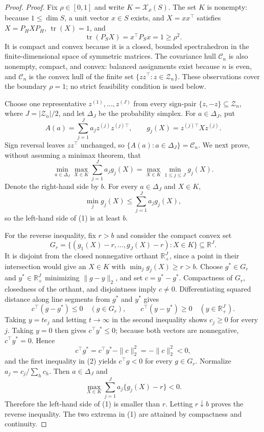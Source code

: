 \documentclass{article}
\begin{document}
\begin{proof}
\textit{Proof.}
Fix \(\rho\in[0,1]\) and write \(K=\mathcal X_\rho(S)\).  The set \(K\) is nonempty: because \(1\leq\dim S\), a unit vector \(x\in S\) exists, and \(X=xx^\top\) satisfies \(X=P_HXP_H\), \(\operatorname{tr}(X)=1\), and
\[
\operatorname{tr}(P_SX)=x^\top P_Sx=1\geq\rho^2.
\]
It is compact and convex because it is a closed, bounded spectrahedron in the finite-dimensional space of symmetric matrices.  The covariance hull \(\mathcal C_n\) is also nonempty, compact, and convex: balanced assignments exist because \(n\) is even, and \(\mathcal C_n\) is the convex hull of the finite set \(\{zz^\top:z\in\mathcal Z_n\}\).  These observations cover the boundary \(\rho=1\); no strict feasibility condition is used below.

Choose one representative \(z^{(1)},\ldots,z^{(J)}\) from every sign-pair \(\{z,-z\}\subseteq\mathcal Z_n\), where \(J=|\mathcal Z_n|/2\), and let \(\Delta_J\) be the probability simplex.  For \(a\in\Delta_J\), put
\[
A(a)=\sum_{j=1}^J a_j z^{(j)}z^{(j)\top},
\qquad
g_j(X)=z^{(j)\top}Xz^{(j)}.
\]
Sign reversal leaves \(zz^\top\) unchanged, so \(\{A(a):a\in\Delta_J\}=\mathcal C_n\).  We next prove, without assuming a minimax theorem, that
\[
\min_{a\in\Delta_J}\max_{X\in K}\sum_{j=1}^J a_jg_j(X)
=
\max_{X\in K}\min_{1\leq j\leq J}g_j(X).
\tag{1}
\]
Denote the right-hand side by \(b\).  For every \(a\in\Delta_J\) and \(X\in K\),
\[
\min_j g_j(X)\leq\sum_{j=1}^J a_jg_j(X),
\]
so the left-hand side of (1) is at least \(b\).

For the reverse inequality, fix \(r>b\) and consider the compact convex set
\[
G_r=\{(g_1(X)-r,\ldots,g_J(X)-r):X\in K\}\subseteq\mathbb R^J.
\]
It is disjoint from the closed nonnegative orthant \(\mathbb R_+^J\), since a point in their intersection would give an \(X\in K\) with \(\min_jg_j(X)\geq r>b\).  Choose \(g^*\in G_r\) and \(y^*\in\mathbb R_+^J\) minimizing \(\|g-y\|_2\), and set \(c=y^*-g^*\).  Compactness of \(G_r\), closedness of the orthant, and disjointness imply \(c\neq0\).  Differentiating squared distance along line segments from \(g^*\) and \(y^*\) gives
\[
c^\top(g-g^*)\leq0\quad(g\in G_r),
\qquad
c^\top(y-y^*)\geq0\quad(y\in\mathbb R_+^J).
\tag{2}
\]
Taking \(y=t e_j\) and letting \(t\to\infty\) in the second inequality shows \(c_j\geq0\) for every \(j\).  Taking \(y=0\) then gives \(c^\top y^*\leq0\); because both vectors are nonnegative, \(c^\top y^*=0\).  Hence
\[
c^\top g^*=c^\top y^*-\|c\|_2^2=-\|c\|_2^2<0,
\]
and the first inequality in (2) yields \(c^\top g<0\) for every \(g\in G_r\).  Normalize \(a_j=c_j/\sum_hc_h\).  Then \(a\in\Delta_J\) and
\[
\max_{X\in K}\sum_{j=1}^J a_j\{g_j(X)-r\}<0.
\]
Therefore the left-hand side of (1) is smaller than \(r\).  Letting \(r\downarrow b\) proves the reverse inequality.  The two extrema in (1) are attained by compactness and continuity.


\end{proof}
\end{document}
